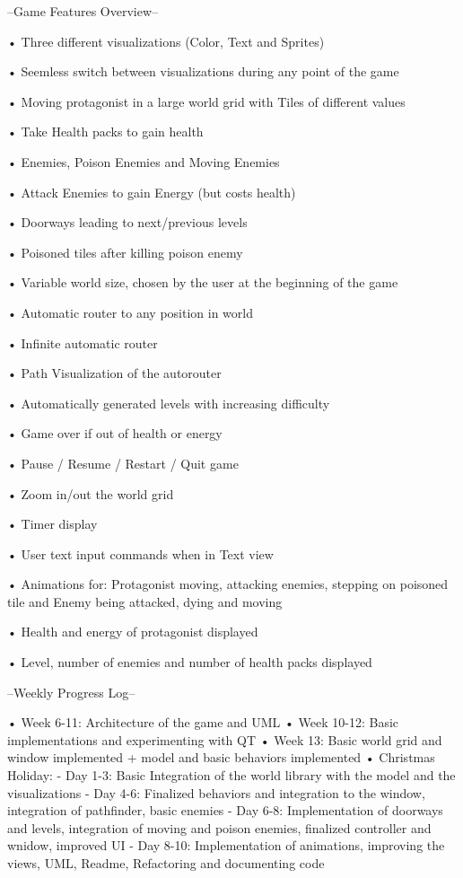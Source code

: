 --Game Features Overview-- \begin{DoxyVerb}• Three different visualizations (Color, Text and Sprites)

• Seemless switch between visualizations during any point of the game

• Moving protagonist in a large world grid with Tiles of different values

• Take Health packs to gain health

• Enemies, Poison Enemies and Moving Enemies

• Attack Enemies to gain Energy (but costs health)

• Doorways leading to next/previous levels

• Poisoned tiles after killing poison enemy

• Variable world size, chosen by the user at the beginning of the game

• Automatic router to any position in world

• Infinite automatic router 

• Path Visualization of the autorouter

• Automatically generated levels with increasing difficulty

• Game over if out of health or energy

• Pause / Resume / Restart / Quit game

• Zoom in/out the world grid

• Timer display

• User text input commands when in Text view

• Animations for: Protagonist moving, attacking enemies, stepping on poisoned tile and Enemy being attacked, dying and moving

• Health and energy of protagonist displayed

• Level, number of enemies and number of health packs displayed
\end{DoxyVerb}


--Weekly Progress Log-- \begin{DoxyVerb}• Week 6-11: Architecture of the game and UML
• Week 10-12: Basic implementations and experimenting with QT
• Week 13: Basic world grid and window implemented + model and basic behaviors implemented
• Christmas Holiday: 
    - Day 1-3: Basic Integration of the world library with the model and the visualizations
    - Day 4-6: Finalized behaviors and integration to the window, integration of pathfinder, basic enemies
    - Day 6-8: Implementation of doorways and levels, integration of moving and poison enemies, finalized controller and wnidow, improved UI 
    - Day 8-10: Implementation of animations, improving the views, UML, Readme, Refactoring and documenting code
\end{DoxyVerb}
 